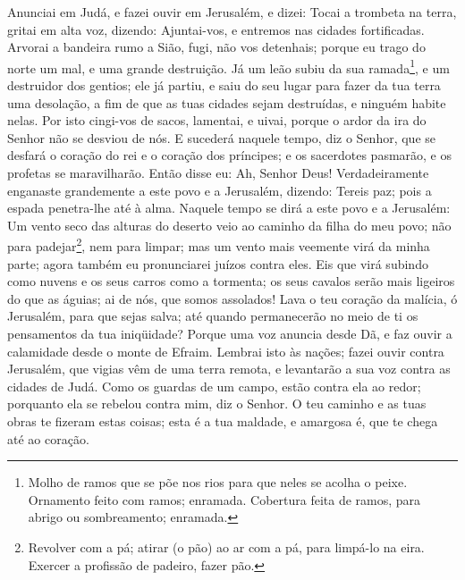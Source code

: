 Anunciai em Judá, e fazei ouvir em Jerusalém, e dizei: Tocai a
trombeta na terra, gritai em alta voz, dizendo: Ajuntai-vos, e
entremos nas cidades fortificadas. Arvorai a bandeira rumo a
Sião, fugi, não vos detenhais; porque eu trago do norte um mal, e
uma grande destruição. Já um leão subiu da sua
ramada\footnote{Molho de ramos que se põe nos rios para que neles se
acolha o peixe. Ornamento feito com ramos; enramada. Cobertura feita
de ramos, para abrigo ou sombreamento; enramada.}, e um destruidor
dos gentios; ele já partiu, e saiu do seu lugar para fazer da tua
terra uma desolação, a fim de que as tuas cidades sejam destruídas,
e ninguém habite nelas. Por isto cingi-vos de sacos, lamentai, e
uivai, porque o ardor da ira do Senhor não se desviou de nós. E
sucederá naquele tempo, diz o Senhor, que se desfará o coração do
rei e o coração dos príncipes; e os sacerdotes pasmarão, e os
profetas se maravilharão. Então disse eu: Ah, Senhor Deus!
Verdadeiramente enganaste grandemente a este povo e a Jerusalém,
dizendo: Tereis paz; pois a espada penetra-lhe até à alma.
Naquele tempo se dirá a este povo e a Jerusalém: Um vento
seco das alturas do deserto veio ao caminho da filha do meu povo;
não para padejar\footnote{Revolver com a pá; atirar (o pão) ao ar
com a pá, para limpá-lo na eira. Exercer a profissão de padeiro,
fazer pão.}, nem para limpar; mas um vento mais veemente virá
da minha parte; agora também eu pronunciarei juízos contra eles.
Eis que virá subindo como nuvens e os seus carros como a
tormenta; os seus cavalos serão mais ligeiros do que as águias; ai
de nós, que somos assolados! Lava o teu coração da malícia, ó
Jerusalém, para que sejas salva; até quando permanecerão no meio de
ti os pensamentos da tua iniqüidade? Porque uma voz anuncia
desde Dã, e faz ouvir a calamidade desde o monte de Efraim.
Lembrai isto às nações; fazei ouvir contra Jerusalém, que
vigias vêm de uma terra remota, e levantarão a sua voz contra as
cidades de Judá. Como os guardas de um campo, estão contra
ela ao redor; porquanto ela se rebelou contra mim, diz o Senhor.
O teu caminho e as tuas obras te fizeram estas coisas; esta é
a tua maldade, e amargosa é, que te chega até ao coração.

